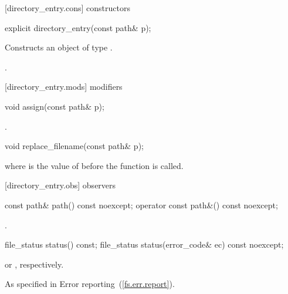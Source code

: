 [directory_entry.cons]{ constructors}

\begin{itemdecl}
explicit directory_entry(const path& p);
\end{itemdecl}

\begin{itemdescr}
\pnum
\effects Constructs an object of type .

\pnum
\postcondition {}.
\end{itemdescr}

[directory_entry.mods]{ modifiers}

\begin{itemdecl}
void assign(const path& p);
\end{itemdecl}

\begin{itemdescr}
\pnum
\postcondition {}.
\end{itemdescr}

\begin{itemdecl}
void replace_filename(const path& p);
\end{itemdecl}

\begin{itemdescr}
\pnum
\postcondition {} where
   is the value of  before the function is
  called.
\end{itemdescr}

[directory_entry.obs]{ observers}

\begin{itemdecl}
const path& path() const noexcept;
operator const path&() const noexcept;
\end{itemdecl}

\begin{itemdescr}
\pnum
\returns {}.
\end{itemdescr}

\begin{itemdecl}
file_status status() const;
file_status status(error_code& ec) const noexcept;
\end{itemdecl}

\begin{itemdescr}
\pnum
\returns {} or , respectively.

\pnum
\throws As specified in Error reporting~(\ref{fs.err.report}).
\end{itemdescr}

